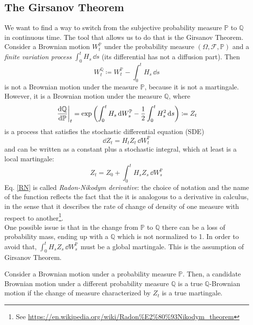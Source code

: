 \subsection{The Girsanov Theorem} %
We want to find a way to switch from the subjective probability measure $\mathbb{P}$ to $\mathbb{Q}$ in continuous time. The tool that allows us to do that is the Girsanov Theorem.\\
Consider a Brownian motion $W_t^{\mathbb{P}}$ under the probability measure $(\Omega, \mathcal{F}, \mathbb{P})$ and a \emph{finite variation process} $\int^t_0 H_s\,\dd s$ (its differential has not a diffusion part). Then
\begin{equation}
    W_t^{\mathbb{Q}} \coloneqq W_t^{\mathbb{P}} - \int^t_0 H_s\,\dd s
\end{equation}
is not a Brownian motion under the measure $\mathbb{P}$, because it is not a martingale. However, it is a Brownian motion under the measure $\mathbb{Q}$, where
\begin{equation}\label{RN}
    \eval{\dv{\mathbb{Q}}{\mathbb{P}}}_t = \exp\left(\int^t_0 H_s\,\dd W_s^{\mathbb{P}}-\dfrac{1}{2}\int^t_0 H_s^2\,\dd s\right) \coloneqq Z_t
\end{equation}
is a process that satisfies the stochastic differential equation (SDE)
\begin{equation}
    \dd Z_t = H_t Z_t\,\dd W_t^\mathbb{P}
\end{equation}
and can be written as a constant plus a stochastic integral, which at least is a local martingale:
\begin{equation}
    Z_t = Z_0 + \int_0^t H_s Z_s\,\dd W_s^{\mathbb{P}}
\end{equation}
Eq. \eqref{RN} is called \emph{Radon-Nikodym derivative}: the choice of notation and the name of the function reflects the fact that the it is analogous to a derivative in calculus, in the sense that it describes the rate of change of density of one measure with respect to another\footnote{See \url{https://en.wikipedia.org/wiki/Radon\%E2\%80\%93Nikodym_theorem}}. \\
One possible issue is that in the change from $\mathbb{P}$ to $\mathbb{Q}$ there can be a loss of probability mass, ending up with a $\mathbb{Q}$ which is not normalized to 1. In order to avoid that, $\int_0^t H_s Z_s\,\dd W_s^{\mathbb{P}}$ must be a global martingale. This is the assumption of Girsanov Theorem.
\begin{theorem}
    Consider a Brownian motion under a probability measure $\mathbb{P}$. Then, a candidate Brownian motion under a different probability measure $\mathbb{Q}$ is a true $\mathbb{Q}$-Brownian motion if the change of measure characterized by $Z_t$ is a true martingale.
\end{theorem}
